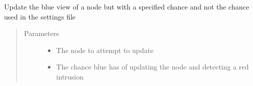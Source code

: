 \documentclass[letterpaper,10pt,english]{sphinxmanual}
\begin{document}
\begin{fulllineitems}
\begin{fulllineitems}
\begin{quote}
\begin{description}
\end{description}\end{quote}

\end{fulllineitems}


\begin{fulllineitems}
\label{\detokenize{source/yawning_titan.envs.generic.core:yawning_titan.envs.generic.core.network_interface.NetworkInterface.immediate_attempt_view_update_with_specified_chance}}
\sphinxAtStartPar
Update the blue view of a node but with a specified chance and not the chance used in the settings file
\begin{quote}\begin{description}
\item[{Parameters}] \leavevmode\begin{itemize}
\item {}
\sphinxAtStartPar
{} \textendash{} The node to attempt to update

\item {}
\sphinxAtStartPar
{} \textendash{} The chance blue has of updating the node and detecting a red intrusion

\end{itemize}

\end{description}\end{quote}

\end{fulllineitems}



\end{fulllineitems}
\end{document}
